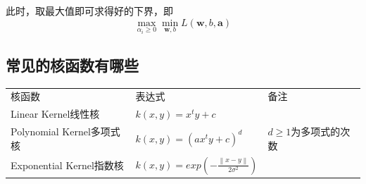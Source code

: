 此时，取最大值即可求得好的下界，即 \[
\max_{\alpha_i \geqslant 0} \min_{\boldsymbol w, b} L(\boldsymbol w, b,\boldsymbol a)
\]

\subsection{常见的核函数有哪些}\label{ux5e38ux89c1ux7684ux6838ux51fdux6570ux6709ux54eaux4e9b}

\begin{longtable}[]{ lll }
\begin{minipage}[b]{0.21\columnwidth}\raggedright\strut
核函数\strut
\end{minipage} & \begin{minipage}[b]{0.44\columnwidth}\raggedright\strut
表达式\strut
\end{minipage} & \begin{minipage}[b]{0.26\columnwidth}\raggedright\strut
备注\strut
\end{minipage}\tabularnewline
\begin{minipage}[t]{0.21\columnwidth}\raggedright\strut
Linear Kernel线性核\strut
\end{minipage} & \begin{minipage}[t]{0.44\columnwidth}\raggedright\strut
$k(x,y)=x^{t}y+c$\strut
\end{minipage} & \begin{minipage}[t]{0.26\columnwidth}\raggedright\strut
\strut
\end{minipage}\tabularnewline
\begin{minipage}[t]{0.21\columnwidth}\raggedright\strut
Polynomial Kernel多项式核\strut
\end{minipage} & \begin{minipage}[t]{0.44\columnwidth}\raggedright\strut
$k(x,y)=(ax^{t}y+c)^{d}$\strut
\end{minipage} & \begin{minipage}[t]{0.26\columnwidth}\raggedright\strut
$d\geqslant1$为多项式的次数\strut
\end{minipage}\tabularnewline
\begin{minipage}[t]{0.21\columnwidth}\raggedright\strut
Exponential Kernel指数核\strut
\end{minipage} & \begin{minipage}[t]{0.44\columnwidth}\raggedright\strut
$k(x,y)=exp(-\frac{\left \|x-y \right \|}{2\sigma ^{2}})$\strut
\end{minipage} & \begin{minipage}[t]{0.26\columnwidth}\raggedright\strut

\end{minipage}
\end{longtable}
